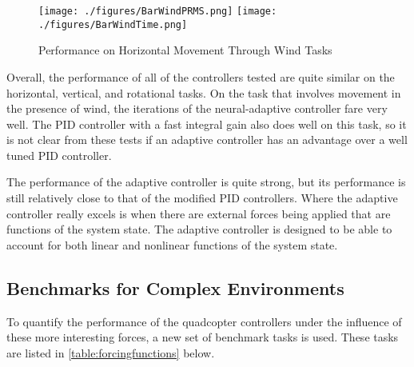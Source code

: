 \documentclass[letterpaper,12pt,titlepage,oneside,final]{book}
\begin{document}
\begin{figure}
\centering
\texttt{[image: ./figures/BarWindPRMS.png]}
\texttt{[image: ./figures/BarWindTime.png]}
\caption{Performance on Horizontal Movement Through Wind Tasks}\label{fig:bar_wind}
\captionsetup{singlelinecheck=off,font=footnotesize}
\caption*{}
\end{figure}




Overall, the performance of all of the controllers tested are quite similar on the horizontal, vertical, and rotational tasks.
On the task that involves movement in the presence of wind, the iterations of the neural-adaptive controller fare very well.
The PID controller with a fast integral gain also does well on this task, so it is not clear from these tests if an adaptive controller has an advantage over a well tuned PID controller.

The performance of the adaptive controller is quite strong, but its performance is still relatively close to that of the modified PID controllers. 
Where the adaptive controller really excels is when there are external forces being applied that are functions of the system state. 
The adaptive controller is designed to be able to account for both linear and nonlinear functions of the system state.

\subsection{Benchmarks for Complex Environments}

To quantify the performance of the quadcopter controllers under the influence of these more interesting forces, a new set of benchmark tasks is used.
These tasks are listed in \autoref{table:forcingfunctions} below. %
\end{document}
